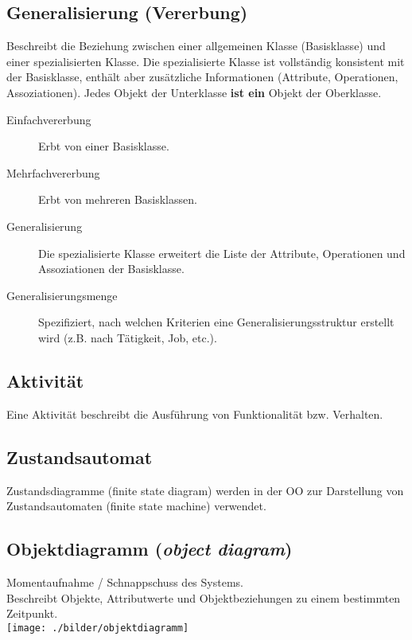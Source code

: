 \subsection{Generalisierung (Vererbung) }
  Beschreibt die Beziehung zwischen einer allgemeinen Klasse (Basisklasse) und
  einer spezialisierten Klasse. Die spezialisierte Klasse ist vollständig
  konsistent mit der Basisklasse, enthält aber zusätzliche Informationen
  (Attribute, Operationen, Assoziationen). Jedes Objekt der Unterklasse \textbf{ist ein} 
  Objekt der Oberklasse.
  
  \begin{description}
    \item[Einfachvererbung]
      Erbt von einer Basisklasse.
    \item[Mehrfachvererbung]
      Erbt von mehreren Basisklassen.
    \item[Generalisierung] 
      Die spezialisierte Klasse erweitert die Liste der
      Attribute, Operationen und Assoziationen der Basisklasse.
    \item[Generalisierungsmenge] 
      Spezifiziert, nach welchen Kriterien eine Generalisierungsstruktur erstellt wird (z.B. nach Tätigkeit, Job, etc.).
  \end{description}

 \begin{multicols}{2}
	\subsection{Aktivität }
  		Eine Aktivität beschreibt die Ausführung von Funktionalität bzw. Verhalten.
	\vfill\null
	\columnbreak
	\subsection{Zustandsautomat }
 		 Zustandsdiagramme (finite state diagram) werden in der OO zur Darstellung von Zustandsautomaten (finite state machine) verwendet.
 \end{multicols}
 
\subsection{Objektdiagramm (\textit{object diagram})}
	\begin{multicols}{2}
		Momentaufnahme / Schnappschuss des Systems. \\
		Beschreibt Objekte, Attributwerte und Objektbeziehungen zu einem bestimmten Zeitpunkt. \\
	\columnbreak
		\texttt{[image: ./bilder/objektdiagramm]}
	\end{multicols}

